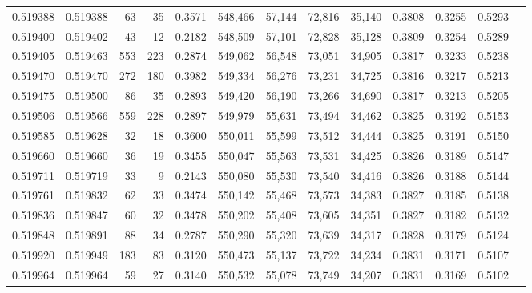 \begin{tabular}{rrrrrrrrrrrrr}
0.519388 & 0.519388 &    63 &    35 &                                     0.3571 & 548,466 &  57,144 &  72,816 &  35,140 & 0.3808 & 0.3255 & 0.5293 \\
0.519400 & 0.519402 &    43 &    12 &                                     0.2182 & 548,509 &  57,101 &  72,828 &  35,128 & 0.3809 & 0.3254 & 0.5289 \\
0.519405 & 0.519463 &   553 &   223 &                                     0.2874 & 549,062 &  56,548 &  73,051 &  34,905 & 0.3817 & 0.3233 & 0.5238 \\
0.519470 & 0.519470 &   272 &   180 &                                     0.3982 & 549,334 &  56,276 &  73,231 &  34,725 & 0.3816 & 0.3217 & 0.5213 \\
0.519475 & 0.519500 &    86 &    35 &                                     0.2893 & 549,420 &  56,190 &  73,266 &  34,690 & 0.3817 & 0.3213 & 0.5205 \\
0.519506 & 0.519566 &   559 &   228 &                                     0.2897 & 549,979 &  55,631 &  73,494 &  34,462 & 0.3825 & 0.3192 & 0.5153 \\
0.519585 & 0.519628 &    32 &    18 &                                     0.3600 & 550,011 &  55,599 &  73,512 &  34,444 & 0.3825 & 0.3191 & 0.5150 \\
0.519660 & 0.519660 &    36 &    19 &                                     0.3455 & 550,047 &  55,563 &  73,531 &  34,425 & 0.3826 & 0.3189 & 0.5147 \\
0.519711 & 0.519719 &    33 &     9 &                                     0.2143 & 550,080 &  55,530 &  73,540 &  34,416 & 0.3826 & 0.3188 & 0.5144 \\
0.519761 & 0.519832 &    62 &    33 &                                     0.3474 & 550,142 &  55,468 &  73,573 &  34,383 & 0.3827 & 0.3185 & 0.5138 \\
0.519836 & 0.519847 &    60 &    32 &                                     0.3478 & 550,202 &  55,408 &  73,605 &  34,351 & 0.3827 & 0.3182 & 0.5132 \\
0.519848 & 0.519891 &    88 &    34 &                                     0.2787 & 550,290 &  55,320 &  73,639 &  34,317 & 0.3828 & 0.3179 & 0.5124 \\
0.519920 & 0.519949 &   183 &    83 &                                     0.3120 & 550,473 &  55,137 &  73,722 &  34,234 & 0.3831 & 0.3171 & 0.5107 \\
0.519964 & 0.519964 &    59 &    27 &                                     0.3140 & 550,532 &  55,078 &  73,749 &  34,207 & 0.3831 & 0.3169 & 0.5102 \\

\end{tabular}
